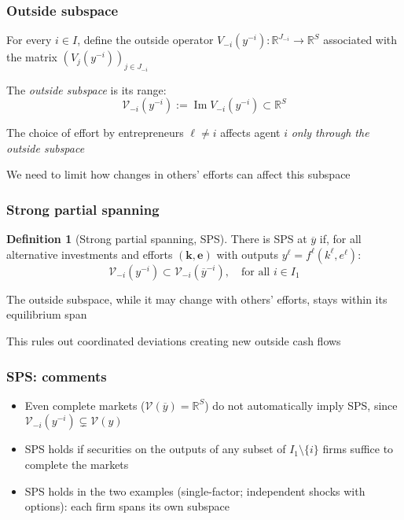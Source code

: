 \documentclass[blue]{beamer}
\def\R{\mathbb{R}}
\DeclareMathOperator\Range{Im}
\theoremstyle{definition}
\theoremstyle{example}
\newtheorem*{definitionns}{Definition}
\begin{document}
\begin{frame}\frametitle{Outside subspace}
For every $i \in I$, define the outside operator $V_{-i}(y^{-i}) : \R^{J_{-i}} \to \R^S$ associated with the matrix $(V_j(y^{-i}))_{j \in J_{-i}}$
\bigskip

The \emph{outside subspace} is its range:
\begin{equation*}
\mathcal{V}_{-i}(y^{-i}) := \Range V_{-i}(y^{-i}) \subset \R^S
\end{equation*}
\bigskip

The choice of effort by entrepreneurs $\ell \neq i$ affects agent $i$ \emph{only through the outside subspace}
\bigskip

We need to limit how changes in others' efforts can affect this subspace
\end{frame}

\begin{frame}\frametitle{Strong partial spanning}
\begin{definitionns}[Strong partial spanning, SPS]
There is SPS at $\overline{y}$ if, for all alternative investments and efforts $(\bm{k}, \bm{e})$ with outputs $y^\ell = f^\ell(k^\ell, e^\ell)$:
\begin{equation*}
\mathcal{V}_{-i}(y^{-i}) \subset \mathcal{V}_{-i}(\overline{y}^{-i}), \quad \text{for all $i \in I_1$}
\end{equation*}
\end{definitionns}
\bigskip

The outside subspace, while it may change with others' efforts, stays within its equilibrium span
\bigskip

This rules out coordinated deviations creating new outside cash flows
\end{frame}

\begin{frame}\frametitle{SPS: comments}
\begin{itemize}
\item Even complete markets ($\mathcal{V}(\overline{y}) = \R^S$) do not automatically imply SPS, since $\mathcal{V}_{-i}(y^{-i}) \subsetneq \mathcal{V}(y)$
\bigskip
\item SPS holds if securities on the outputs of any subset of $I_1 \setminus \{i\}$ firms suffice to complete the markets
\bigskip
\item SPS holds in the two examples (single-factor; independent shocks with options): each firm spans its own subspace
\end{itemize}
\end{frame}
\end{document}

